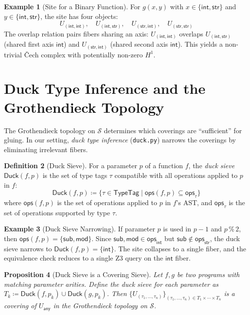 \documentclass[11pt,a4paper]{report}
\theoremstyle{definition}
\newtheorem{definition}{Definition}[chapter]
\newtheorem{example}[definition]{Example}
\theoremstyle{plain}
\newtheorem{proposition}[definition]{Proposition}
\newcommand{\site}{\mathcal{S}}
\begin{document}
\begin{example}[Site for a Binary Function]
\label{ex:binary-site}
For $g(x, y)$ with $x \in \{\mathsf{int}, \mathsf{str}\}$ and
$y \in \{\mathsf{int}, \mathsf{str}\}$, the site has four objects:
\[
  U_{(\mathsf{int},\mathsf{int})}, \quad
  U_{(\mathsf{int},\mathsf{str})}, \quad
  U_{(\mathsf{str},\mathsf{int})}, \quad
  U_{(\mathsf{str},\mathsf{str})}
\]
The overlap relation pairs fibers sharing an axis:
$U_{(\mathsf{int},\mathsf{int})}$ overlaps
$U_{(\mathsf{int},\mathsf{str})}$ (shared first axis $\mathsf{int}$)
and $U_{(\mathsf{str},\mathsf{int})}$ (shared second axis
$\mathsf{int}$).  This yields a non-trivial \v{C}ech complex with
potentially non-zero $H^1$.
\end{example}

\section{Duck Type Inference and the Grothendieck Topology}

The Grothendieck topology on $\site$ determines which coverings are
``sufficient'' for gluing.  In our setting, \emph{duck type inference}
(\texttt{duck.py}) narrows the coverings by eliminating irrelevant
fibers.

\begin{definition}[Duck Sieve]
\label{def:duck-sieve}
For a parameter $p$ of a function $f$, the \emph{duck sieve}
$\mathsf{Duck}(f, p)$ is the set of type tags $\tau$ compatible with
all operations applied to $p$ in $f$:
\[
  \mathsf{Duck}(f, p) \coloneqq
    \bigl\{\tau \in \mathsf{TypeTag} \;\big|\;
    \mathsf{ops}(f, p) \subseteq \mathsf{ops}_\tau\bigr\}
\]
where $\mathsf{ops}(f, p)$ is the set of operations applied to $p$
in $f$'s AST, and $\mathsf{ops}_\tau$ is the set of operations
supported by type $\tau$.
\end{definition}

\begin{example}[Duck Sieve Narrowing]
If parameter $p$ is used in $p - 1$ and $p \mathbin{\%} 2$, then
$\mathsf{ops}(f, p) = \{\mathsf{sub}, \mathsf{mod}\}$.  Since
$\mathsf{sub}, \mathsf{mod} \in \mathsf{ops}_{\mathsf{int}}$ but
$\mathsf{sub} \notin \mathsf{ops}_{\mathsf{str}}$, the duck sieve
narrows to $\mathsf{Duck}(f, p) = \{\mathsf{int}\}$.  The site
collapses to a single fiber, and the equivalence check reduces to a
single Z3 query on the $\mathsf{int}$ fiber.
\end{example}

\begin{proposition}[Duck Sieve is a Covering Sieve]
\label{prop:duck-covering}
Let $f, g$ be two programs with matching parameter arities.  Define
the duck sieve for each parameter as
$T_k \coloneqq \mathsf{Duck}(f, p_k) \cup \mathsf{Duck}(g, p_k)$.
Then $\{U_{(\tau_1,\ldots,\tau_n)}\}_{(\tau_1,\ldots,\tau_n) \in
T_1 \times \cdots \times T_n}$ is a covering of $U_\mathsf{any}$ in
the Grothendieck topology on $\site$.
\end{proposition}
\end{document}
